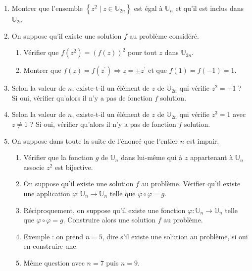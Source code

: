 \documentclass[landscape,twocolumn,leqno,a4paper,10pt]{report} %
\begin{document}
\begin{enumerate}
	\item Montrer que l'ensemble $\left\{z^{2} \mid z \in \mathbb{U}_{2n}\right\}$ est égal à $\mathbb{U}_{n}$ et qu'il est inclus dans $\mathbb{U}_{2n}$
	\item On suppose qu'il existe une solution $f$ au problème considéré.
	\begin{enumerate}
		\item Vérifier que $f\left(z^{2}\right)=(f(z))^{2}$ pour tout $z$ dans $\mathbb{U}_{2n}$.
		\item Montrer que $f(z)=f\left(z^{\prime}\right) \Longrightarrow z=\pm z^{\prime}$ et que $f(1)=f(-1)=1$.
	\end{enumerate}
	\item Selon la valeur de $n$, existe-t-il un élément de $z$ de $\mathbb{U}_{2n}$ qui vérifie $z^{2}=-1$ ? Si oui, vérifier qu'alors il n'y a pas de fonction $f$ solution.
	\item Selon la valeur de $n$, existe-t-il un élément de $z$ de $\mathbb{U}_{2n}$ qui vérifie $z^{3}=1$ avec $z \neq 1$ ? Si oui, vérifier qu'alors il n'y a pas de fonction $f$ solution.
	\item On suppose dans toute la suite de l'énoncé que l'entier $n$ est impair.
	\begin{enumerate}
		\item Vérifier que la fonction $g$ de $\mathbb{U}_{n}$ dans lui-même qui à $z$ appartenant à $\mathbb{U}_{n}$ associe $z^{2}$ est bijective.
		\item On suppose qu'il existe une solution $f$ au problème. Vérifier qu'il existe une application $\varphi: \mathbb{U}_{n} \longrightarrow \mathbb{U}_{n}$ telle que $\varphi \circ \varphi=g$.
		\item Réciproquement, on suppose qu'il existe une fonction $\varphi: \mathbb{U}_{n} \longrightarrow \mathbb{U}_{n}$ telle que $\varphi \circ \varphi=g$. Construire alors une solution $f$ au problème.
		\item Exemple : on prend $n=5$, dire s'il existe une solution au problème, si oui en construire une.
		\item Même question avec $n=7$ puis $n=9$.
	\end{enumerate}
\end{enumerate}
\end{document}
